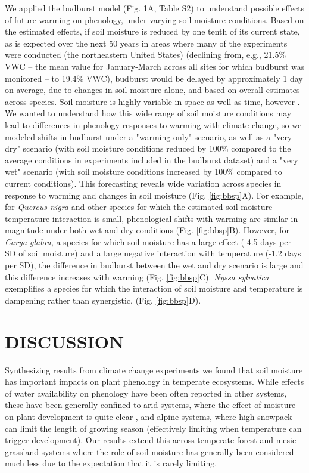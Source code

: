 \documentclass{article}
\begin{document}
\par We applied the budburst model (Fig. 1A, Table S2) to understand possible effects of future warming on phenology, under varying soil moisture conditions. Based on the estimated effects, if soil moisture is reduced by one tenth of its current state, as is expected over the next 50 years in areas where many of the experiments were conducted (the northeastern United States) \citep{berg2017} (declining from, e.g., 21.5\% VWC -- the mean value for January-March across all sites for which budburst was monitored -- to 19.4\% VWC), budburst would be delayed by approximately 1 day on average, due to changes in soil moisture alone, and based on overall estimates across species. Soil moisture is highly variable in space as well as time, however \citep{vergopolan2022high}. We wanted to understand how this wide range of soil moisture conditions may lead to differences in phenology responses to warming with climate change, so we modeled shifts in budburst under a "warming only" scenario, as well as a "very dry" scenario (with soil moisture conditions reduced by 100\% compared to the average conditions in experiments included in the budburst dataset) and a "very wet" scenario (with soil moisture conditions increased by 100\% compared to current conditions). This forecasting reveals wide variation across species in response to warming and changes in soil moisture (Fig. \ref{fig:bbsp}A). For example, for \textit{Quercus nigra} and other species for which the estimated soil moisture - temperature interaction is small, phenological shifts with warming are similar in magnitude under both wet and dry conditions (Fig. \ref{fig:bbsp}B). However, for \textit{Carya glabra}, a species for which soil moisture has a large effect (-4.5 days per SD of soil moisture) and a large negative interaction with temperature (-1.2 days per SD), the difference in budburst between the wet and dry scenario is large and this difference increases with warming (Fig. \ref{fig:bbsp}C). \textit{Nyssa sylvatica} exemplifies a species for which the interaction of soil moisture and temperature is dampening rather than synergistic, (Fig. \ref{fig:bbsp}D).


\section* {DISCUSSION}
\par Synthesizing results from climate change experiments we found that soil moisture has important impacts on plant phenology in temperate ecosystems. While effects of water availability on phenology have been often reported in other systems, these have been generally confined to arid systems, where the effect of moisture on plant development is quite clear \cite[e.g.,][]{reich1984,van1993,cleverly2016soil,bertiller1991seasonal}, and alpine systems, where high snowpack can limit the length of growing season (effectively limiting when temperature can trigger development). Our results extend this across temperate forest and mesic grassland systems where the role of soil moisture has generally been considered much less due to the expectation that it is rarely limiting. 
\end{document}
